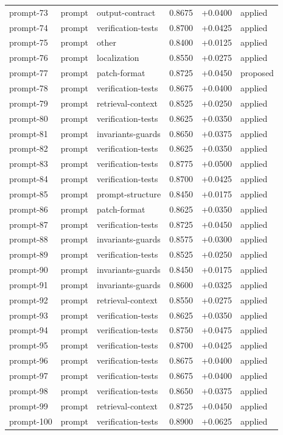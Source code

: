 \begin{center}
\begin{longtable}{llp{5.2cm}rrl}
prompt-73 & prompt & output-contract & 0.8675 & +0.0400 & applied \\
prompt-74 & prompt & verification-tests & 0.8700 & +0.0425 & applied \\
prompt-75 & prompt & other & 0.8400 & +0.0125 & applied \\
prompt-76 & prompt & localization & 0.8550 & +0.0275 & applied \\
prompt-77 & prompt & patch-format & 0.8725 & +0.0450 & proposed \\
prompt-78 & prompt & verification-tests & 0.8675 & +0.0400 & applied \\
prompt-79 & prompt & retrieval-context & 0.8525 & +0.0250 & applied \\
prompt-80 & prompt & verification-tests & 0.8625 & +0.0350 & applied \\
prompt-81 & prompt & invariants-guards & 0.8650 & +0.0375 & applied \\
prompt-82 & prompt & verification-tests & 0.8625 & +0.0350 & applied \\
prompt-83 & prompt & verification-tests & 0.8775 & +0.0500 & applied \\
prompt-84 & prompt & verification-tests & 0.8700 & +0.0425 & applied \\
prompt-85 & prompt & prompt-structure & 0.8450 & +0.0175 & applied \\
prompt-86 & prompt & patch-format & 0.8625 & +0.0350 & applied \\
prompt-87 & prompt & verification-tests & 0.8725 & +0.0450 & applied \\
prompt-88 & prompt & invariants-guards & 0.8575 & +0.0300 & applied \\
prompt-89 & prompt & verification-tests & 0.8525 & +0.0250 & applied \\
prompt-90 & prompt & invariants-guards & 0.8450 & +0.0175 & applied \\
prompt-91 & prompt & invariants-guards & 0.8600 & +0.0325 & applied \\
prompt-92 & prompt & retrieval-context & 0.8550 & +0.0275 & applied \\
prompt-93 & prompt & verification-tests & 0.8625 & +0.0350 & applied \\
prompt-94 & prompt & verification-tests & 0.8750 & +0.0475 & applied \\
prompt-95 & prompt & verification-tests & 0.8700 & +0.0425 & applied \\
prompt-96 & prompt & verification-tests & 0.8675 & +0.0400 & applied \\
prompt-97 & prompt & verification-tests & 0.8675 & +0.0400 & applied \\
prompt-98 & prompt & verification-tests & 0.8650 & +0.0375 & applied \\
prompt-99 & prompt & retrieval-context & 0.8725 & +0.0450 & applied \\
prompt-100 & prompt & verification-tests & 0.8900 & +0.0625 & applied \\
\bottomrule\end{longtable}\end{center}
\clearpage
